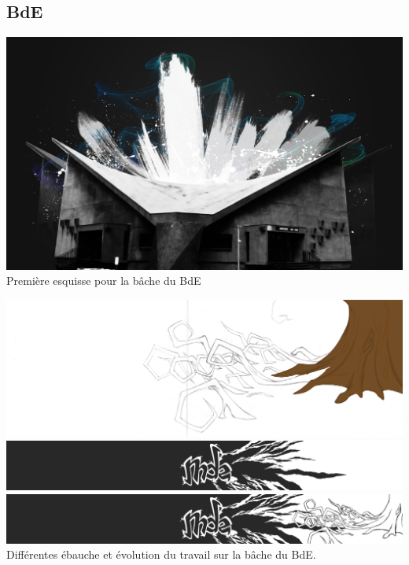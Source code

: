     \subsection{BdE}
        \begin{center}
            \includegraphics[width=\textwidth]{img/amphi.jpg}\\
            Première esquisse pour la bâche du BdE
        \end{center}

        \begin{center}
            \includegraphics[width=\textwidth]{img/arbre.png}
            \includegraphics[width=\textwidth]{img/mde.png}
            \includegraphics[width=\textwidth]{img/mde+arbre.png}
            Différentes ébauche et évolution du travail sur la bâche du BdE.
        \end{center}
            
